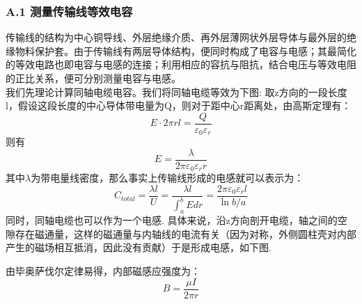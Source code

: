 \documentclass[UTF8]{ctexart}
\begin{document}
\subsubsection*{A.1 测量传输线等效电容}
传输线的结构为中心铜导线、外层绝缘介质、再外层薄网状外层导体与最外层的绝缘物料保护套。由于传输线有两层导体结构，便同时构成了电容与电感；其最简化的等效电路也即电容与电感的连接；利用相应的容抗与阻抗，结合电压与等效电阻的正比关系，便可分别测量电容与电感。\\
我们先理论计算同轴电缆电容。我们将同轴电缆等效为下图:
取z方向的一段长度l，假设这段长度的中心导体带电量为Q，则对于距中心r距离处，由高斯定理有：
\begin{equation}
    E\cdot 2\pi rl=\frac{Q}{\varepsilon_0\varepsilon_r}
\end{equation}
则有
\begin{equation}
E=\frac{\lambda}{2\pi \varepsilon_0\varepsilon_r r}
\end{equation}其中$\lambda$为带电量线密度，那么事实上传输线形成的电感就可以表示为：
\begin{equation}
    C_{total}=\frac{\lambda l}{U}=\frac{\lambda l}{\int^b_a E dr}=\frac{2\pi\varepsilon_0\varepsilon_r l}{\ln{b/a}}
 \end{equation}
 同时，同轴电缆也可以作为一个电感. 具体来说，沿z方向剖开电缆，轴之间的空隙存在磁通量，这样的磁通量与内轴线的电流有关（因为对称，外侧圆柱壳对内部产生的磁场相互抵消，因此没有贡献）于是形成电感，如下图.
 \begin{figure}[H]
 \end{figure}
  由毕奥萨伐尔定律易得，内部磁感应强度为：
 \begin{equation}
    B=\frac{\mu I}{2\pi r}
 \end{equation}
\end{document}
